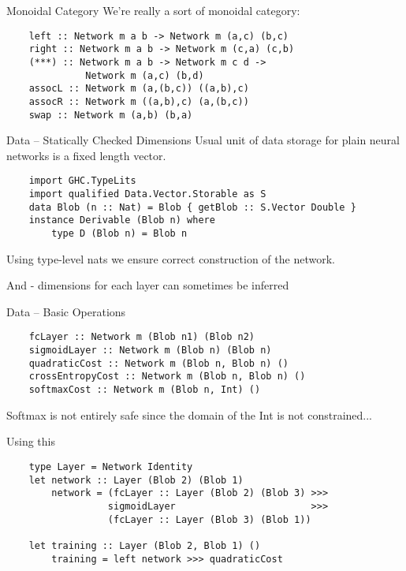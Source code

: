 \documentclass[10pt]{beamer}
\newenvironment{xframe}[1][]{\begin{frame}[fragile,environment=xframe,#1]}{\end{frame}}
\begin{document}
\begin{xframe}{Monoidal Category}
  We're really a sort of monoidal category:

  \begin{verbatim}
    left :: Network m a b -> Network m (a,c) (b,c)
    right :: Network m a b -> Network m (c,a) (c,b)
    (***) :: Network m a b -> Network m c d ->
              Network m (a,c) (b,d)
    assocL :: Network m (a,(b,c)) ((a,b),c)
    assocR :: Network m ((a,b),c) (a,(b,c))
    swap :: Network m (a,b) (b,a)
  \end{verbatim}

\end{xframe}

\begin{xframe}{Data -- Statically Checked Dimensions}
  Usual unit of data storage for plain neural networks is a fixed length vector.

  \begin{verbatim}
    import GHC.TypeLits
    import qualified Data.Vector.Storable as S
    data Blob (n :: Nat) = Blob { getBlob :: S.Vector Double }
    instance Derivable (Blob n) where
        type D (Blob n) = Blob n
  \end{verbatim}

  Using type-level nats we ensure correct construction of the network.

  And - dimensions for each layer can sometimes be inferred
\end{xframe}

\begin{xframe}{Data -- Basic Operations}
  \begin{verbatim}
    fcLayer :: Network m (Blob n1) (Blob n2)
    sigmoidLayer :: Network m (Blob n) (Blob n)
    quadraticCost :: Network m (Blob n, Blob n) ()
    crossEntropyCost :: Network m (Blob n, Blob n) ()
    softmaxCost :: Network m (Blob n, Int) ()
  \end{verbatim}

  Softmax is not entirely safe since the domain of the Int is not constrained...
\end{xframe}

\begin{xframe}{Using this}
  \begin{verbatim}
    type Layer = Network Identity
    let network :: Layer (Blob 2) (Blob 1)
        network = (fcLayer :: Layer (Blob 2) (Blob 3) >>>
                  sigmoidLayer                        >>>
                  (fcLayer :: Layer (Blob 3) (Blob 1))

    let training :: Layer (Blob 2, Blob 1) ()
        training = left network >>> quadraticCost
  \end{verbatim}
\end{xframe}
\end{document}
